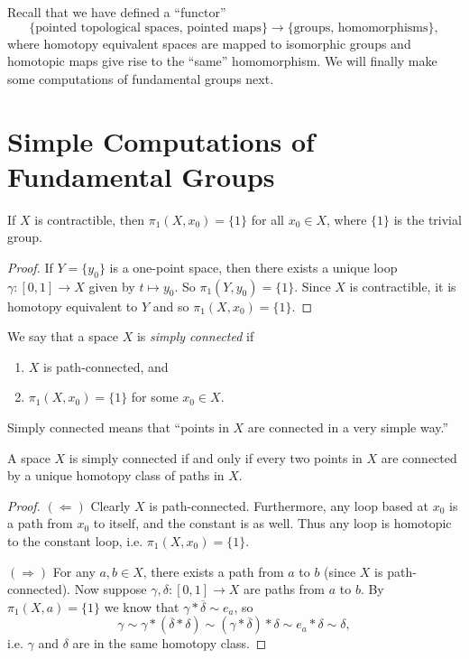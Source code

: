 \begin{remark}
  Recall that we have defined a ``functor''
  \[
    \{\text{pointed topological spaces, pointed maps}\}
    \to \{\text{groups, homomorphisms}\},
  \]
  where homotopy equivalent spaces are mapped to
  isomorphic
  groups and homotopic maps give rise to the ``same''
  homomorphism. We will finally make some
  computations of fundamental groups next.
\end{remark}

\section{Simple Computations of Fundamental Groups}

\begin{lemma}
  If $X$ is contractible, then
  $\pi_1(X, x_0) = \{1\}$ for all $x_0 \in X$, where
  $\{1\}$ is the trivial group.
\end{lemma}

\begin{proof}
  If $Y = \{y_0\}$ is a one-point space, then there
  exists a unique loop $\gamma : [0, 1] \to X$
  given by $t \mapsto y_0$. So $\pi_1(Y, y_0) = \{1\}$.
  Since $X$ is contractible, it is homotopy
  equivalent to $Y$ and so $\pi_1(X, x_0) = \{1\}$.
\end{proof}

\begin{definition}
  We say that a space $X$ is \emph{simply connected} if
  \begin{enumerate}
    \item $X$ is path-connected, and
    \item $\pi_1(X, x_0) = \{1\}$
      for some $x_0 \in X$.
  \end{enumerate}
\end{definition}

\begin{remark}
  Simply connected means that ``points in $X$ are
  connected in a very simple way.''
\end{remark}

\begin{lemma}
  A space $X$ is simply connected if and only if
  every two points in $X$ are connected by a unique
  homotopy class of paths in $X$.
\end{lemma}

\begin{proof}
  $(\Leftarrow)$ Clearly $X$ is path-connected.
  Furthermore, any loop based at $x_0$ is a path
  from $x_0$ to itself, and the constant is as well.
  Thus any loop is homotopic to the constant loop,
  i.e. $\pi_1(X, x_0) = \{1\}$.

  $(\Rightarrow)$ For any $a, b \in X$, there exists a
  path from $a$ to $b$ (since $X$ is path-connected).
  Now suppose $\gamma, \delta : [0, 1] \to X$
  are paths from $a$ to $b$. By
  $\pi_1(X, a) = \{1\}$ we know that
  $\gamma * \overline{\delta} \sim e_a$, so
  \[
    \gamma \sim \gamma * (\overline{\delta} * \delta)
    \sim (\gamma * \overline{\delta}) * \delta
    \sim e_a * \delta
    \sim \delta,
  \]
  i.e. $\gamma$ and $\delta$ are in the same
  homotopy class.
\end{proof}

